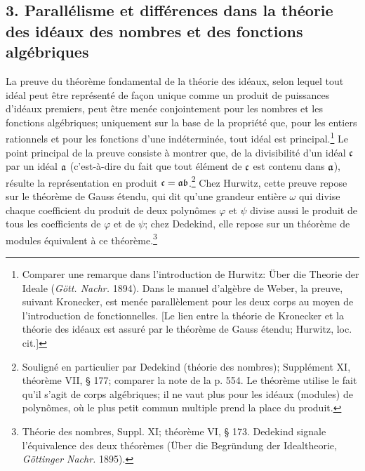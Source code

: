 \subsection*{3. Parallélisme et différences dans la théorie des idéaux des nombres et des fonctions algébriques}

La preuve du théorème fondamental de la théorie des idéaux, selon lequel tout idéal peut être représenté de façon unique comme un produit de puissances d'idéaux premiers, peut être menée conjointement pour les nombres et les fonctions algébriques; uniquement sur la base de la propriété que, pour les entiers rationnels et pour les fonctions d'une indéterminée, tout idéal est principal.\footnote{Comparer une remarque dans l'introduction de Hurwitz: Über die Theorie der Ideale (\emph{Gött. Nachr.} 1894). Dans le manuel d'algèbre de Weber, la preuve, suivant Kronecker, est menée parallèlement pour les deux corps au moyen de l'introduction de fonctionnelles. [Le lien entre la théorie de Kronecker et la théorie des idéaux est assuré par le \og{}théorème de Gauss étendu\fg{}; Hurwitz, loc. cit.]} Le point principal de la preuve consiste à montrer que, de la divisibilité d'un idéal \(\mathfrak c\) par un idéal \(\mathfrak a\) (c'est-à-dire du fait que tout élément de \(\mathfrak c\) est contenu dans \(\mathfrak a\)), résulte la représentation en produit \(\mathfrak c=\mathfrak a\mathfrak b\).\footnote{Souligné en particulier par Dedekind (théorie des nombres); Supplément XI, théorème VII, \S{} 177; comparer la note de la p. 554. Le théorème utilise le fait qu'il s'agit de corps algébriques; il ne vaut plus pour les idéaux (modules) de polynômes, où le plus petit commun multiple prend la place du produit.} Chez Hurwitz, cette preuve repose sur le \og{}théorème de Gauss étendu\fg{}, qui dit qu'une grandeur entière \(\omega\) qui divise chaque coefficient du produit de deux polynômes \(\varphi\) et \(\psi\) divise aussi le produit de tous les coefficients de \(\varphi\) et de \(\psi\); chez Dedekind, elle repose sur un théorème de modules équivalent à ce théorème.\footnote{Théorie des nombres, Suppl. XI; théorème VI, \S{} 173. Dedekind signale l'équivalence des deux théorèmes (Über die Begründung der Idealtheorie, \emph{Göttinger Nachr.} 1895).}

